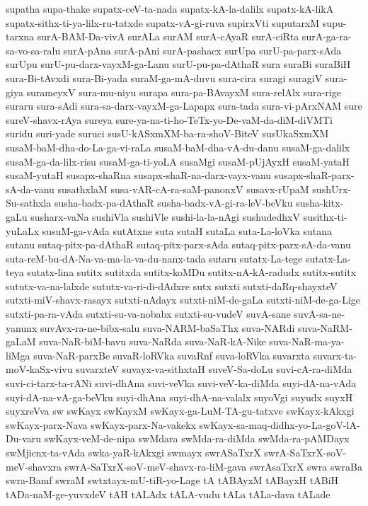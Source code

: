 {supatha
supa-thake
supatx-ceV-ta-nada
supatx-kA-la-dalilx
supatx-kA-likA
supatx-sithx-ti-ya-lilx-ru-tatxde
supatx-vA-gi-ruva
supirxVti
suputarxM
supu-tarxna
surA-BAM-Da-vivA
surALa
surAM
surA-cAyaR
surA-ciRta
surA-ga-ra-sa-vo-sa-ralu
surA-pAna
surA-pAni
surA-pashacx
surUpa
surU-pa-parx-sAda
surUpu
surU-pu-darx-vayxM-ga-Lanu
surU-pu-pa-dAthaR
sura
suraBi
suraBiH
sura-Bi-tAvxdi
sura-Bi-yada
suraM-ga-mA-duvu
sura-cira
suragi
suragiV
sura-giya
surameyxV
sura-mu-niyu
surapa
sura-pa-BAvayxM
sura-relAlx
sura-rige
suraru
sura-sAdi
sura-sa-darx-vayxM-ga-Lapapx
sura-tada
sura-vi-pArxNAM
sure
sureV-shavx-rAya
sureya
sure-ya-na-ti-ho-TeTx-yo-De-vaM-da-diM-diVMTi
suridu
suri-yade
suruci
susU-kASxmXM-ba-ra-shoV-BiteV
susUkaSxmXM
susaM-baM-dha-do-La-ga-vi-raLa
susaM-baM-dha-vA-du-danu
susaM-ga-dalilx
susaM-ga-da-lilx-risu
susaM-ga-ti-yoLA
susaMgi
susaM-pUjAyxH
susaM-yataH
susaM-yutaH
susapx-shaRna
susapx-shaR-na-darx-vayx-vanu
susapx-shaR-parx-sA-da-vanu
susathxlaM
susa-vAR-cA-ra-saM-panonxV
susavx-rUpaM
sushUrx-Su-sathxla
susha-badx-pa-dAthaR
susha-badx-vA-gi-ra-leV-beVku
susha-kitx-gaLu
susharx-vaNa
sushiVla
sushiVle
sushi-la-la-nAgi
sushudedhxV
susithx-ti-yuLaLx
susuM-ga-vAda
sutAtxne
suta
sutaH
sutaLa
suta-La-loVka
sutana
sutanu
sutaq-pitx-pa-dAthaR
sutaq-pitx-parx-sAda
sutaq-pitx-parx-sA-da-vanu
suta-reM-bu-dA-Na-va-ma-la-va-du-nanx-tada
sutaru
sutatx-La-tege
sutatx-La-teya
sutatx-lina
sutitx
sutitxda
sutitx-koMDu
sutitx-nA-kA-radudx
sutitx-sutitx
sututx-va-na-lalxde
sututx-va-ri-di-dAdxre
sutx
sutxti
sutxti-daRq-shayxteV
sutxti-miV-shavx-rasayx
sutxti-nAdayx
sutxti-niM-de-gaLa
sutxti-niM-de-ga-Lige
sutxti-pa-ra-vAda
sutxti-su-va-nobabx
sutxti-su-vudeV
suvA-sane
suvA-sa-ne-yanunx
suvAvx-ra-ne-bibx-salu
suva-NARM-baSaThx
suva-NARdi
suva-NaRM-gaLaM
suva-NaR-biM-bavu
suva-NaRda
suva-NaR-kA-Nike
suva-NaR-ma-ya-liMga
suva-NaR-parxBe
suvaR-loRVka
suvaRnf
suva-loRVka
suvarxta
suvarx-ta-moV-kaSx-vivu
suvarxteV
suvayx-va-sithxtaH
suveV-Sa-doLu
suvi-cA-ra-diMda
suvi-ci-tarx-ta-rANi
suvi-dhAna
suvi-veVka
suvi-veV-ka-diMda
suyi-dA-na-vAda
suyi-dA-na-vA-ga-beVku
suyi-dhAna
suyi-dhA-na-valalx
suyoVgi
suyudx
suyxH
suyxreVva
sw
swKayx
swKayxM
swKayx-ga-LuM-TA-gu-tatxve
swKayx-kAkxgi
swKayx-parx-Nava
swKayx-parx-Na-vakekx
swKayx-sa-maq-didhx-yo-La-goV-lA-Du-varu
swKayx-veM-de-nipa
swMdara
swMda-ra-diMda
swMda-ra-pAMDayx
swMjicnx-ta-vAda
swka-yaR-kAkxgi
swmayx
swrASaTxrX
swrA-SaTxrX-soV-meV-shavxra
swrA-SaTxrX-soV-meV-shavx-ra-liM-gava
swrAsaTxrX
swra
swraBa
swra-Bamf
swraM
swtxtayx-mU-tiR-yo-Lage
tA
tABAyxM
tABayxH
tABiH
tADa-naM-ge-yuvxdeV
tAH
tALAdx
tALA-vudu
tALa
tALa-dava
tALade
}
